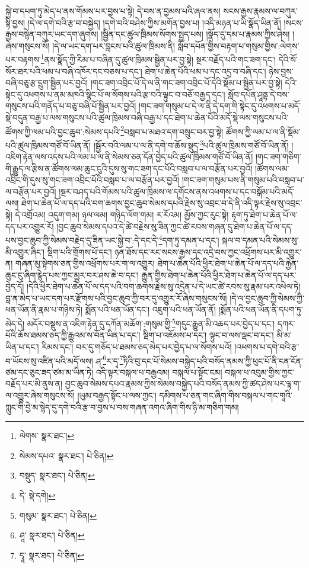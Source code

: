 སྐྱེ་བ་དཔག་ཏུ་མེད་པ་ནས་གོམས་པར་བྱས་པ་སྟེ། དེ་བས་ན་བྱམས་པའི་ཞལ་ནས། སངས་རྒྱས་རྣམས་ལ་བཀུར་སྟི་བྱས། །དེ་ལ་དགེ་བའི་རྩ་བ་བསྐྱེད། །དགེ་བའི་བཤེས་ཀྱིས་མགོན་བྱས་པ། །འདི་མཉན་པ་ཡི་སྣོད་ཡིན་ནོ། །སངས་རྒྱས་བསྙེན་བཀུར་ཡང་དག་ཞུགས། །སྦྱིན་དང་ཚུལ་ཁྲིམས་སོགས་སྤྱད་པས། །སྣོད་དུ་དམ་པ་རྣམས་ཀྱིས་ཤེས། །
ཞེས་གསུངས་སོ། །དེ་ལ་ཡང་དག་པར་བླངས་པའི་ཚུལ་ཁྲིམས་ནི། སློབ་དཔོན་གྱིས་བརྟག་པ་གསུམ་གྱིས་:ལེགས་པར་བརྟགས་\footnote{ལེགས་  སྣར་ཐང་། }ནས་སྣོད་ཀྱི་རིམ་པ་བཞིན་དུ་ཚུལ་ཁྲིམས་སྦྱིན་པར་བྱ་སྟེ། སྔར་བརྗོད་པའི་གང་ཟག་དང་། དེའི་སོ་སོར་ཐར་པའི་ཕམ་པ་བཞི་འཁོར་དང་བཅས་པ་དང་། ཐེག་པ་ཆེན་པོའི་ཕམ་པ་དང་འདྲ་བ་བཞི་དང་། ཉེས་བྱས་བཞི་བཅུ་རྩ་དྲུག་སྦྱིན་པར་བྱའོ། །གང་ཟག་འབྲིང་པོ་དེ་ལ་ནི་གང་ཟག་འབྲིང་པོ་དེའི་སྡོམ་པ་སྦྱིན་པར་བྱ་སྟེ། དེའི་སྟེང་དུ་འཕགས་པ་ནམ་མཁའི་སྙིང་པོ་ལ་སོགས་པའི་རྩ་བའི་ལྟུང་བ་བཅོ་བརྒྱད་དང་། སློབ་དཔོན་ཤཱནྟ་དེ་བས་གསུངས་པའི་གནོད་པ་བཅུ་བཞི་པོ་སྦྱིན་པར་བྱའོ། །གང་ཟག་གསུམ་པ་དེ་ལ་ནི་དེ་དག་གི་སྟེང་དུ་འཕགས་པ་མདོ་སྡེ་བདུན་བརྒྱ་པ་ལས་གསུངས་པའི་ཚུལ་ཁྲིམས་བཞི་བརྒྱ་པ་དང་ཐེག་པ་ཆེན་པོའི་མདོ་སྡེ་ལས་གསུངས་པའི་ཚོགས་ཀྱི་ལམ་པའི་བྱང་ཆུབ་:སེམས་དཔའི་\footnote{སེམས་དཔའ་  སྣར་ཐང་།  པེ་ཅིན། }བསླབ་པ་མཐའ་དག་བསྲུང་བར་བྱ་སྟེ། ཚོགས་ཀྱི་ལམ་པ་ལ་ནི་སྡོམ་པའི་ཚུལ་ཁྲིམས་གཙོ་བོ་ཡིན་ནོ། །སྦྱོར་བའི་ལམ་པ་ལ་ནི་དགེ་བ་ཆོས་སྡུད་\footnote{བསྡུད་  སྣར་ཐང་།  པེ་ཅིན། }པའི་ཚུལ་ཁྲིམས་གཙོ་བོ་ཡིན་ནོ། །འཇིག་རྟེན་ལས་འདས་པའི་ལམ་པ་ལ་ནི་སེམས་ཅན་དོན་བྱེད་པའི་ཚུལ་ཁྲིམས་གཙོ་བོ་ཡིན་ནོ། །གང་ཟག་གཅིག་གི་རྒྱུད་ལ་རྩིས་ན་ཚོགས་ལམ་ཆུང་ངུའི་དུས་སུ་གང་ཟག་དང་པོའི་བསླབ་པ་ལ་བརྩོན་པར་བྱའོ། །ཚོགས་ལམ་འབྲིང་གི་དུས་སུ་གང་ཟག་འབྲིང་པོའི་བསླབ་པ་ལ་བརྩོན་པར་བྱའོ། །གང་ཟག་གསུམ་པས་ནི་གསུམ་པའི་བསླབ་པ་ལ་བརྩོན་པར་བྱའོ། །སྔར་བཤད་པའི་གོམས་པའི་ཚུལ་ཁྲིམས་ལ་དགོངས་ནས་འཕགས་པ་དང་བསྒོམ་པའི་མདོ་ལས། ཐེག་པ་ཆེན་པོ་ལ་དད་པའི་བག་ཆགས་བྱང་ཆུབ་སེམས་དཔའི་རྗེས་སུ་འབྲང་བ་དེ་ནི་འདི་ལྟར་རྗེས་སུ་འབྲང་སྟེ། དེ་འགྲོའམ། འདུག་གམ། ཉལ་ལམ། གཉིད་ལོག་གམ། ར་རོའམ། མྱོས་ཀྱང་རུང་སྟེ། རྟག་ཏུ་ཐེག་པ་ཆེན་པོ་ལ་དད་པར་འགྱུར་རོ། །བྱང་ཆུབ་སེམས་དཔའ་དེ་ཚེ་བརྗེས་སུ་ཟིན་ཀྱང་ཚེ་རབས་གཞན་དུ་ཐེག་པ་ཆེན་པོ་ལ་དད་པས་བྱང་ཆུབ་ཀྱི་སེམས་བརྗེད་དུ་ཟིན་ཡང་སྐྱེ་བ་:དེ་དང་དེ་\footnote{དེ་  སྡེ་དགེ། }དག་ཏུ་དམན་པ་དང་། སྐལ་བ་དམན་པའི་སེམས་སུ་མི་འགྱུར་ཞིང་། སྡིག་པའི་གྲོགས་པོ་དང་། ཉན་ཐོས་དང་རང་སངས་རྒྱས་དང་འདྲེ་བས་ཀྱང་འཕྲོགས་པར་མི་འགྱུར་ན། གཞན་མུ་སྟེགས་ཅན་གྱིས་འཕྲོགས་པར་ག་ལ་འགྱུར། ཐེག་པ་ཆེན་པོའི་ཕྱིར་ཐེག་པ་ཆེན་པོ་ལ་དད་པའི་རྐྱེན་ཆུང་ངུ་ཞིག་རྙེད་པས་ཀྱང་མྱུར་བར་ཤས་ཆེ་བ་དང་། རྒྱུན་གྱིས་ཐེག་པ་ཆེན་པོའི་ཕྱིར་ཐེག་པ་ཆེན་པོ་ལ་དད་པར་བྱེད་དོ། །དེའི་ཕྱིར་ཐེག་པ་ཆེན་པོ་ལ་དད་པའི་བག་ཆགས་རྗེས་སུ་འདྲེན་པ་དེ་ཡང་ཚེ་རབས་སུ་རྣམ་པར་འཕེལ་ཏེ། བླ་ན་མེད་པ་ཡང་དག་པར་རྫོགས་པའི་བྱང་ཆུབ་ཀྱི་བར་དུ་འགྱུར་རོ་ཞེས་གསུངས་སོ། །དེ་ལ་བྱང་ཆུབ་ཀྱི་སེམས་ཀྱི་ཕན་ཡོན་ནི་རྣམ་པ་གཉིས་ཏེ། སྨོན་པའི་ཕན་ཡོན་དང་། འཇུག་པའི་ཕན་ཡོན་ནོ། །སྨོན་པའི་ཕན་ཡོན་ནི་དཔག་ཏུ་མེད་དེ། མདོར་བསྡུས་ན་འཇིག་རྟེན་དུ་དཀོན་མཆོག་:གསུམ་གྱི་\footnote{གསུམ་  སྣར་ཐང་།  པེ་ཅིན། }གདུང་རྒྱུན་མི་འཆད་པར་བྱེད་པ་དང་། དཀར་པོའི་ཆོས་ཐམས་ཅད་ཀྱི་རྒྱུའམ་ས་བོན་ཡིན་པ་དང་། སྡིག་པ་འཇོམས་པ་དང་། ལྟུང་བ་ལས་ལྡང་བ་དང་། མི་མ་ཡིན་པ་དང་། རིམས་དང་། བར་དུ་གཅོད་པ་ཐམས་ཅད་མེད་པར་བྱེད་པ་ལ་སོགས་པའོ། །འཕགས་པ་དགེ་བའི་རྩ་བ་ཡོངས་སུ་འཛིན་པའི་མདོ་ལས། ཤ་\footnote{ཤཱ་  སྣར་ཐང་།  པེ་ཅིན། }ར་དྭ་\footnote{དྭཱ་  སྣར་ཐང་།  པེ་ཅིན། }ཏིའི་བུ་དང་པོ་སེམས་བསྐྱེད་པའི་བསོད་ནམས་ཀྱི་ཕུང་པོ་ནི་ངན་ངོན་ཙམ་དང་ཅུང་ཟད་ཙམ་མ་ཡིན་ཏེ། འདི་ལྟར་བསྐལ་པ་བརྒྱའམ། བསྐལ་པ་སྟོང་ངམ། བསྐལ་པ་འབུམ་གྱིས་ཀྱང་བརྗོད་པར་མི་ནུས་ན། བྱང་ཆུབ་སེམས་དཔའ་རྣམས་ཀྱིས་སེམས་བསྐྱེད་པའི་བསོད་ནམས་ཀྱི་ཚད་ཤེས་པར་ལྟ་ག་ལ་འགྱུར་ཞེས་གསུངས་སོ། །ཡུམ་བརྒྱད་སྟོང་པ་ལས་ཀྱང་། དམིགས་པ་ཅན་གང་ཞིག་གིས་བསྐལ་པ་གང་གཱའི་ཀླུང་གི་བྱེ་མ་སྙེད་དུ་དགེ་བའི་རྩ་བ་བྱས་པ་བས་གཞན་འགའ་ཞིག་གིས་ཉི་མ་གཅིག་གམ། 